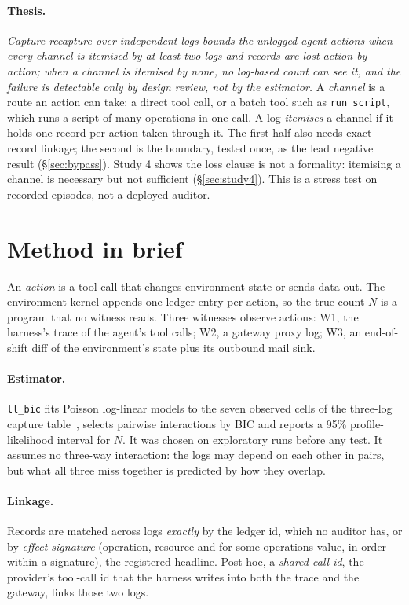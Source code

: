 \documentclass[11pt]{article}
\begin{document}
\paragraph{Thesis.} \emph{Capture-recapture over independent logs bounds the unlogged
agent actions when every channel is itemised by at least two logs and records are lost
action by action; when a channel is itemised by none, no log-based count can see it, and
the failure is detectable only by design review, not by the estimator.} A
\emph{channel} is a route an action can take: a direct tool call, or a batch tool such as
\texttt{run\_script}, which runs a script of many operations in one call. A log
\emph{itemises} a channel if it holds one record per action taken through it. The first
half also needs exact record linkage; the second is the boundary, tested once, as the lead
negative result (\S\ref{sec:bypass}). Study 4 shows the loss clause is not a formality:
itemising a channel is necessary but not sufficient (\S\ref{sec:study4}). This is a stress
test on recorded episodes, not a deployed auditor.

\section{Method in brief}
\label{sec:setup}

An \emph{action} is a tool call that changes environment state or sends data out. The
environment kernel appends one ledger entry per action, so the true count $N$ is a
program that no witness reads. Three witnesses observe actions: W1, the harness's trace of
the agent's tool calls; W2, a gateway proxy log; W3, an end-of-shift diff of the
environment's state plus its outbound mail sink.

\paragraph{Estimator.} \texttt{ll\_bic} fits Poisson log-linear models to the seven
observed cells of the three-log capture table~\citep{fienberg1972}, selects pairwise
interactions by BIC and reports a 95\% profile-likelihood interval for $N$. It was chosen
on exploratory runs before any test. It assumes no three-way interaction: the logs may
depend on each other in pairs, but what all three miss together is predicted by how they
overlap.

\paragraph{Linkage.} Records are matched across logs \emph{exactly} by the ledger id,
which no auditor has, or by \emph{effect signature} (operation, resource and for some
operations value, in order within a signature), the registered headline. Post hoc, a
\emph{shared call id}, the provider's tool-call id that the harness writes into both the
trace and the gateway, links those two logs.
\end{document}
